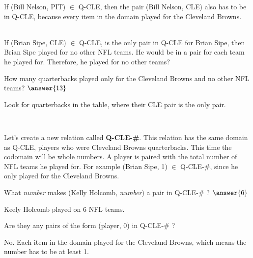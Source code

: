\documentclass{ximera}
\begin{document}
\begin{fact}

If (Bill Nelson, PIT) $\in$ Q-CLE, then the pair (Bill Nelson, CLE) also has to be in Q-CLE, because every item in the domain played for the Cleveland Browns.

\quad \\

If (Brian Sipe, CLE) $\in$ Q-CLE, is the only pair in Q-CLE for Brian Sipe, then Brian Sipe played for no other NFL teams.  He would be in a pair for each team he played for. Therefore, he played for no other teams?



\begin{problem} How many quarterbacks played only for the Cleveland Browns and no other NFL teams? $\answer{13}$
\begin{feedback}
Look for quarterbacks in the table, where their CLE pair is the only pair.
\end{feedback}
\end{problem}


\end{fact}


\quad \\


\begin{example}
Let's create a new relation called \textbf{Q-CLE-\#}. This relation has the same domain as Q-CLE, players who were Cleveland Browns quarterbacks. This time the codomain will be whole numbers. A player is paired with the total number of NFL teams he played for.
For example (Brian Sipe, 1) $\in$ Q-CLE-\#, since he only played for the Cleveland Browns.


\begin{question} 
What \textit{number} makes (Kelly Holcomb, \textit{number}) a pair in Q-CLE-\# ? $\answer{6}$
\begin{feedback}
Keely Holcomb played on 6 NFL teams.
\end{feedback}
\end{question}


\begin{question}
Are they any pairs of the form (player, 0) in Q-CLE-\# ?
\begin{multipleChoice} 
\end{multipleChoice}
\begin{feedback}
No. Each item in the domain played for the Cleveland Browns, which means the number has to be at least 1.
\end{feedback}
\end{question}


\end{example}
\end{document}
